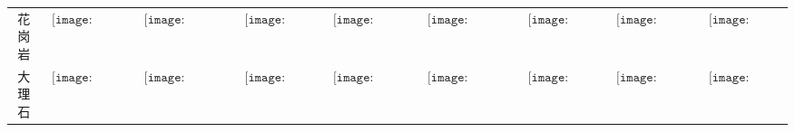 \begin{longtable}{|c|cccccccc|}
花岗岩&$\begin{array}{c}\texttt{[image: figures/Granite\_Candle.png]}\end{array}$&$\begin{array}{c}\texttt{[image: figures/Granite\_Candelabra.png]}\end{array}$&$\begin{array}{c}\texttt{[image: figures/Granite\_Lamp.png]}\end{array}$&$\begin{array}{c}\texttt{[image: figures/Granite\_Lantern.png]}\end{array}$&$\begin{array}{c}\texttt{[image: figures/Granite\_Chandelier.png]}\end{array}$&$\begin{array}{c}\texttt{[image: figures/Granite\_Door.png]}\end{array}$&$\begin{array}{c}\texttt{[image: figures/Granite\_Toilet.png]}\end{array}$&$\begin{array}{c}\texttt{[image: figures/Granite\_Chest.png]}\end{array}$\\
大理石&$\begin{array}{c}\texttt{[image: figures/Marble\_Candle.png]}\end{array}$&$\begin{array}{c}\texttt{[image: figures/Marble\_Candelabra.png]}\end{array}$&$\begin{array}{c}\texttt{[image: figures/Marble\_Lamp.png]}\end{array}$&$\begin{array}{c}\texttt{[image: figures/Marble\_Lantern.png]}\end{array}$&$\begin{array}{c}\texttt{[image: figures/Marble\_Chandelier.png]}\end{array}$&$\begin{array}{c}\texttt{[image: figures/Marble\_Door.png]}\end{array}$&$\begin{array}{c}\texttt{[image: figures/Marble\_Toilet.png]}\end{array}$&$\begin{array}{c}\texttt{[image: figures/Marble\_Chest.png]}\end{array}$\\

\end{longtable}
